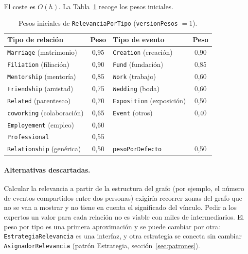 El coste es $O(h)$. La Tabla~\ref{tab:pesos} recoge los pesos iniciales.

\begin{table}[htbp]
\centering
\small
\caption{Pesos iniciales de \texttt{RelevanciaPorTipo} (\texttt{versionPesos} $=1$).}
\label{tab:pesos}
\begin{tabular}{|l|c|l|c|}
\hline
\textbf{Tipo de relación} & \textbf{Peso} & \textbf{Tipo de evento} & \textbf{Peso} \\ \hline
\texttt{Marriage} (matrimonio) & 0,95 & \texttt{Creation} (creación) & 0,90 \\ \hline
\texttt{Filiation} (filiación) & 0,90 & \texttt{Fund} (fundación) & 0,85 \\ \hline
\texttt{Mentorship} (mentoría) & 0,85 & \texttt{Work} (trabajo) & 0,60 \\ \hline
\texttt{Friendship} (amistad) & 0,75 & \texttt{Wedding} (boda) & 0,60 \\ \hline
\texttt{Related} (parentesco) & 0,70 & \texttt{Exposition} (exposición) & 0,50 \\ \hline
\texttt{coworking} (colaboración) & 0,65 & \texttt{Event} (otros) & 0,40 \\ \hline
\texttt{Employement} (empleo) & 0,60 & & \\ \hline
\texttt{Professional} & 0,55 & & \\ \hline
\texttt{Relationship} (genérica) & 0,50 & \texttt{pesoPorDefecto} & 0,50 \\ \hline
\end{tabular}
\end{table}


\paragraph{Alternativas descartadas.} Calcular la relevancia a partir de la estructura del grafo (por ejemplo, el número de eventos compartidos entre dos personas) exigiría recorrer zonas del grafo que no se van a mostrar y no tiene en cuenta el significado del vínculo. Pedir a los expertos un valor para cada relación no es viable con miles de intermediarios. El peso por tipo es una primera aproximación y se puede cambiar por otra: \texttt{EstrategiaRelevancia} es una interfaz, y otra estrategia se conecta sin cambiar \texttt{AsignadorRelevancia} (patrón Estrategia, sección~\ref{sec:patrones}).

